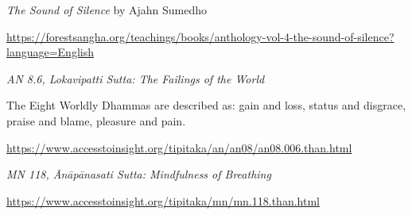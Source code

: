 \begin{thebibliography}{9}
 \emph{The Sound of Silence} by Ajahn Sumedho

  {\urlsize \url{https://forestsangha.org/teachings/books/anthology-vol-4-the-sound-of-silence?language=English}}

 \emph{AN 8.6, Lokavipatti Sutta: The Failings of the World}

  The Eight Worldly Dhammas are described as: gain and loss, status and
  disgrace, praise and blame, pleasure and pain.

  \mbox{\urlsize \url{https://www.accesstoinsight.org/tipitaka/an/an08/an08.006.than.html}}

 \emph{MN 118, Ānāpānasati Sutta: Mindfulness of Breathing}

  {\urlsize \url{https://www.accesstoinsight.org/tipitaka/mn/mn.118.than.html}}

\end{thebibliography}